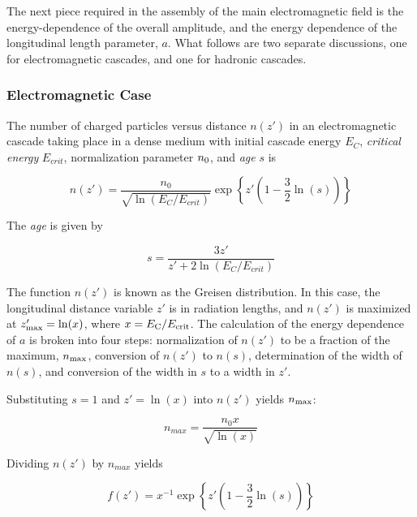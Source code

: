 \documentclass[amsmath,amssymb,aps,prd,10pt,twocolumn]{revtex4}
\begin{document}
The next piece required in the assembly of the main electromagnetic field is the energy-dependence of the overall amplitude, and the energy dependence of the longitudinal length parameter, $a$.  What follows are two separate discussions, one for electromagnetic cascades, and one for hadronic cascades.

\subsubsection{Electromagnetic Case}

The number of charged particles versus distance $n(z')$ in an electromagnetic cascade taking place in a dense medium with initial cascade energy $E_C$, \textit{critical energy} $E_{crit}$, normalization parameter $n_{\rm 0}$, and \textit{age} $s$ is \cite{10.1016/j.astropartphys.2017.03.008}

\begin{equation}
n(z') = \frac{n_0}{\sqrt{\ln(E_C/E_{crit})}} \exp \left \lbrace z'\left(1 - \frac{3}{2}\ln(s) \right) \right \rbrace
\end{equation}

The \textit{age} is given by

\begin{equation}
s = \frac{3z'}{z' + 2\ln(E_C/E_{crit})}
\end{equation}

The function $n(z')$ is known as the Greisen distribution.  In this case, the longitudinal distance variable $z'$ is in radiation lengths, and $n(z')$ is maximized at $z'_{\rm max} = \ln(x)$, where $x = E_{\rm C}/E_{\rm crit}$.  The calculation of the energy dependence of $a$ is broken into four steps: normalization of $n(z')$ to be a fraction of the maximum, $n_{\rm max}$, conversion of $n(z')$ to $n(s)$, determination of the width of $n(s)$, and conversion of the width in $s$ to a width in $z'$.

Substituting $s = 1$ and $z' = \ln(x)$ into $n(z')$ yields $n_{\rm max}$:

\begin{equation}
n_{max} = \frac{n_0 x}{\sqrt{\ln(x)}} 
\end{equation}

Dividing $n(z')$ by $n_{max}$ yields

\begin{equation}
f(z') = x^{-1} \exp \left \lbrace z'\left(1 - \frac{3}{2}\ln(s) \right) \right \rbrace \label{eq:norm1}
\end{equation}
\end{document}

